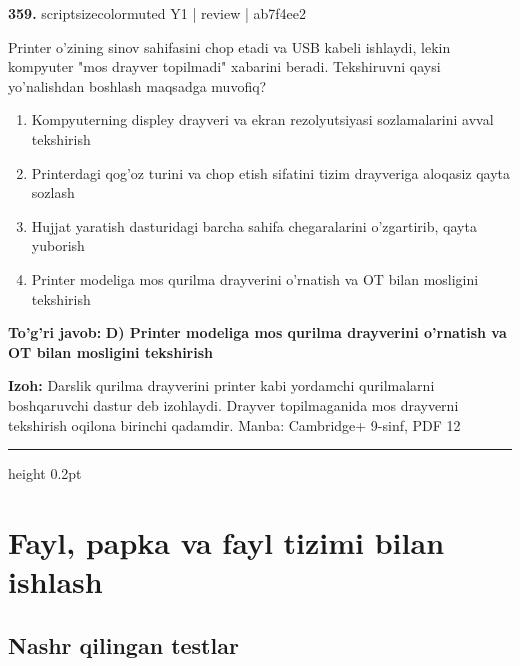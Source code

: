 \documentclass[10pt,a4paper]{article}
\begin{document}
{\bfseries\sffamily\color{ink} 359.} {scriptsizecolor{muted} Y1 | review | ab7f4ee2}
\par
Printer o'zining sinov sahifasini chop etadi va USB kabeli ishlaydi, lekin kompyuter "mos drayver topilmadi" xabarini beradi. Tekshiruvni qaysi yo'nalishdan boshlash maqsadga muvofiq?
\begin{enumerate}[label=\Alph*),leftmargin=9mm]
\item Kompyuterning displey drayveri va ekran rezolyutsiyasi sozlamalarini avval tekshirish
\item Printerdagi qog'oz turini va chop etish sifatini tizim drayveriga aloqasiz qayta sozlash
\item Hujjat yaratish dasturidagi barcha sahifa chegaralarini o'zgartirib, qayta yuborish
\item Printer modeliga mos qurilma drayverini o'rnatish va OT bilan mosligini tekshirish
\end{enumerate}
\begin{tcolorbox}[enhanced,breakable,colback=teal!4,colframe=teal!60!black,boxrule=0.45pt,arc=1.2mm,left=2.7mm,right=2.7mm,top=1.8mm,bottom=1.8mm,before skip=2mm,after skip=2mm]
{\bfseries\sffamily\color{teal}To'g'ri javob:} \textbf{D) Printer modeliga mos qurilma drayverini o'rnatish va OT bilan mosligini tekshirish}
\par\smallskip
{\bfseries Izoh:} Darslik qurilma drayverini printer kabi yordamchi qurilmalarni boshqaruvchi dastur deb izohlaydi. Drayver topilmaganida mos drayverni tekshirish oqilona birinchi qadamdir. Manba: Cambridge+ 9-sinf, PDF 12
\end{tcolorbox}
\vspace{2mm}\hrule height 0.2pt\vspace{3mm}
\clearpage
\section{Fayl, papka va fayl tizimi bilan ishlash}
\subsection{Nashr qilingan testlar}
\end{document}
